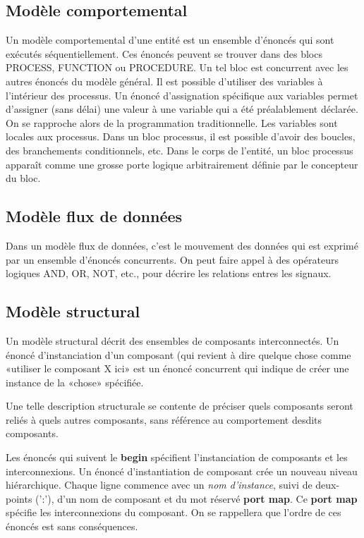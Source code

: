 \documentclass[11pt]{article}
\begin{document}
\subsection{Modèle comportemental}
\label{sec:orgea2859a}

Un modèle comportemental d'une entité est un ensemble d'énoncés qui
sont exécutés séquentiellement. Ces énoncés peuvent se trouver dans
des blocs PROCESS, FUNCTION ou PROCEDURE. Un tel bloc est concurrent
avec les autres énoncés du modèle général. Il est possible d'utiliser
des variables à l'intérieur des processus. Un énoncé d'assignation
spécifique aux variables permet d'assigner (sans délai) une valeur à
une variable qui a été préalablement déclarée. On se rapproche alors
de la programmation traditionnelle. Les variables sont locales aux
processus. Dans un bloc processus, il est possible d'avoir des
boucles, des branchements conditionnels, etc. Dans le corps de
l'entité, un bloc processus apparaît comme une grosse porte logique
arbitrairement définie par le concepteur du bloc.

\subsection{Modèle flux de données}
\label{sec:org489ca2e}

Dans un modèle flux de données, c'est le mouvement des données qui est
exprimé par un ensemble d'énoncés concurrents. On peut faire appel à
des opérateurs logiques AND, OR, NOT, etc., pour décrire les relations
entres les signaux.

\subsection{Modèle structural}
\label{sec:org89ba1e0}

Un modèle structural décrit des ensembles de composants
interconnectés. Un énoncé d'instanciation d'un composant (qui revient
à dire quelque chose comme «utiliser le composant X ici» est un énoncé
concurrent qui indique de créer une instance de la «chose» spécifiée.

Une telle description structurale se contente de préciser quels
composants seront reliés à quels autres composants, sans référence au
comportement desdits composants.

Les énoncés qui suivent le \textbf{begin} spécifient l'instanciation de
composants et les interconnexions. Un énoncé d'instantiation de
composant crée un nouveau niveau hiérarchique. Chaque ligne commence
avec un \emph{nom d'instance}, suivi de deux-points (':'), d'un nom de
composant et du mot réservé \textbf{port map}.  Ce \textbf{port map} spécifie les
interconnexions du composant. On se rappellera que l'ordre de ces
énoncés est sans conséquences.
\end{document}
